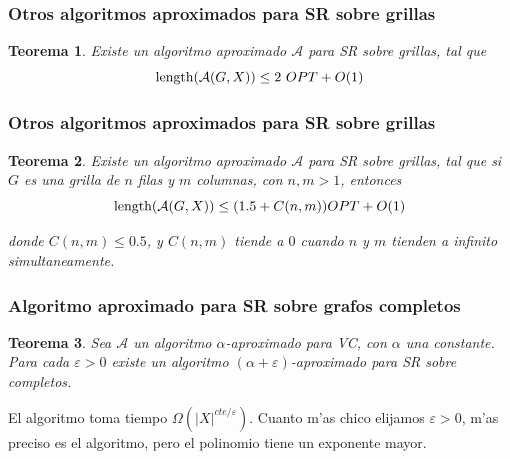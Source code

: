 \documentclass{beamer}
\newcommand{\length}{\textnormal{length}}
\newcommand{\probl}[1]{\textnormal{\textsf{#1}}}
\newtheorem*{thm}{Teorema}
\begin{document}
\begin{frame}
\frametitle{Otros algoritmos aproximados para \probl{SR} sobre grillas}

\begin{thm}
Existe un algoritmo aproximado $\mathcal{A}$ para \probl{SR} sobre grillas, tal que
\[\length(\mathcal{A}(G, X)) \leq 2 \text{ } OPT + O(1)\]
\end{thm}

\pause

\begin{figure}
	\begin{center}
		
	\end{center}	
\end{figure}

\end{frame}

\begin{frame}
\frametitle{Otros algoritmos aproximados para \probl{SR} sobre grillas}

\pause

\begin{thm}
Existe un algoritmo aproximado $\mathcal{A}$ para \probl{SR} sobre grillas, tal que si $G$ es una grilla de $n$ filas y $m$ columnas, con $n, m > 1$, entonces 
\[\length(\mathcal{A}(G, X)) \leq (1.5 + C(n, m)) OPT + O(1)\]

donde $C(n, m) \leq 0.5$, y $C(n, m)$ tiende a $0$ cuando $n$ y $m$ tienden a infinito simultaneamente.
\end{thm}

\pause

\begin{figure}
	\begin{center}
		
	\end{center}	
\end{figure}

\end{frame}

\begin{frame}
\frametitle{Algoritmo aproximado para \probl{SR} sobre grafos completos}

\pause

\begin{thm}
Sea $\mathcal{A}$ un algoritmo $\alpha$-aproximado para \probl{VC}, con $\alpha$ una constante. Para cada $\varepsilon > 0$ existe un algoritmo $(\alpha + \varepsilon)$-aproximado para \probl{SR} sobre completos.
\end{thm}

\pause

\vspace{3mm}
El algoritmo toma tiempo $\Omega(|X|^{cte / \varepsilon})$. Cuanto m'as chico elijamos $\varepsilon > 0$, m'as preciso es el algoritmo, pero el polinomio tiene un exponente mayor.
\end{frame}
\end{document}
